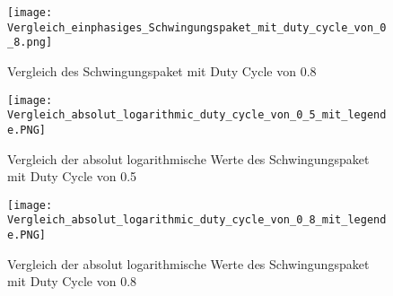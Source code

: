 \begin{appendix}
\newpage

\begin{figure}[ht!]
	\centering
	\texttt{[image: Vergleich\_einphasiges\_Schwingungspaket\_mit\_duty\_cycle\_von\_0\_8.png]}	
	\caption{Vergleich des Schwingungspaket mit Duty Cycle von 0.8}
	\label{fig:Vergleich des Schwingungspaket mit Duty Cycle von 0.8}
\end{figure}

\begin{figure}[ht!]
	\centering
	\texttt{[image: Vergleich\_absolut\_logarithmic\_duty\_cycle\_von\_0\_5\_mit\_legende.PNG]}	
	\caption{Vergleich der absolut logarithmische Werte des Schwingungspaket mit Duty Cycle von 0.5}
	\label{fig:Vergleich_absolut_logarithmic_duty_cycle_von_0_5_mit_legende}
\end{figure}

\begin{figure}[ht!]
	\centering
	\texttt{[image: Vergleich\_absolut\_logarithmic\_duty\_cycle\_von\_0\_8\_mit\_legende.PNG]}	
	\caption{Vergleich der absolut logarithmische Werte des Schwingungspaket mit Duty Cycle von 0.8}
	\label{fig:Vergleich_absolut_logarithmic_duty_cycle_von_0_8_mit_legende}
\end{figure}


\end{appendix}
